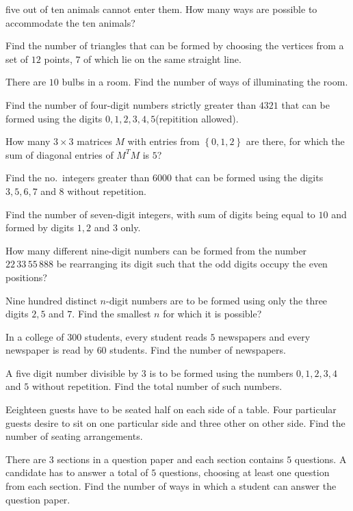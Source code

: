   five out of ten animals cannot enter them. How many ways are possible to accommodate the ten animals?
\item Find the number of triangles that can be formed by choosing the vertices from a set of $12$ points,
  $7$ of which lie on the same straight line.
\item There are $10$ bulbs in a room. Find the number of ways of illuminating the room.
\item Find the number of four-digit numbers strictly greater than $4321$ that can be formed using the digits
  $0, 1, 2, 3, 4, 5$(repitition allowed).
\item How many $3\times3$ matrices $M$ with entries from $\left\{0, 1, 2\right\}$ are there, for which the
  sum of diagonal entries of $M^TM$ is $5$?
\item Find the no.\ integers greater than $6000$ that can be formed using the digits $3, 5, 6, 7$ and $8$ without
  repetition.
\item Find the number of seven-digit integers, with sum of digits being equal to $10$ and formed by digits
  $1, 2$ and $3$ only.
\item How many different nine-digit numbers can be formed from the number $22\,33\,55\,888$ be rearranging
  its digit such that the odd digits occupy the even positions?
\item Nine hundred distinct $n$-digit numbers are to be formed using only the three digits $2, 5$ and
  $7$. Find the smallest $n$ for which it is possible?
\item In a college of $300$ students, every student reads $5$ newspapers and every newspaper is read by $60$
  students. Find the number of newspapers.
\item A five digit number divisible by $3$ is to be formed using the numbers $0, 1, 2, 3, 4$ and $5$ without
  repetition. Find the total number of such numbers.
\item Eeighteen guests have to be seated half on each side of a table. Four particular guests desire to sit
  on one particular side and three other on other side. Find the number of seating arrangements.
\item There are $3$ sections in a question paper and each section contains $5$ questions. A candidate has to
  answer a total of $5$ questions, choosing at least one question from each section. Find the number of ways
  in which a student can answer the question paper.
\stopitemize
